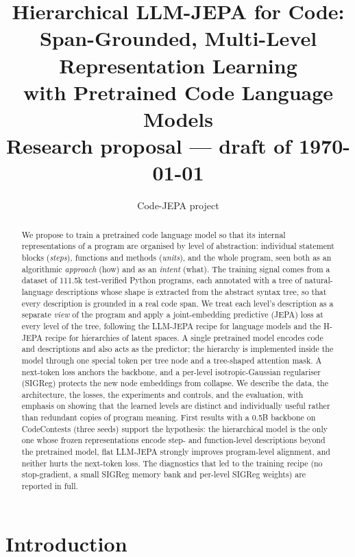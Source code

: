 \documentclass[11pt]{article}
\title{Hierarchical LLM-JEPA for Code:\\
Span-Grounded, Multi-Level Representation Learning\\
with Pretrained Code Language Models\\[0.5em]
\large Research proposal --- draft of \today}
\author{Code-JEPA project}
\date{}
\begin{document}
\maketitle

\begin{abstract}
We propose to train a pretrained code language model so that its internal representations of a program are
organised by level of abstraction: individual statement blocks (\emph{steps}), functions and methods (\emph{units}),
and the whole program, seen both as an algorithmic \emph{approach} (how) and as an \emph{intent} (what). The training
signal comes from a dataset of 111.5k test-verified Python programs, each annotated with a tree of natural-language
descriptions whose shape is extracted from the abstract syntax tree, so that every description is grounded in a
real code span. We treat each level's description as a separate \emph{view} of the program and apply a joint-embedding
predictive (JEPA) loss at every level of the tree, following the LLM-JEPA recipe for language models and the
H-JEPA recipe for hierarchies of latent spaces. A single pretrained model encodes code and descriptions and also
acts as the predictor; the hierarchy is implemented inside the model through one special token per tree node and
a tree-shaped attention mask. A next-token loss anchors the backbone, and a per-level isotropic-Gaussian regulariser
(SIGReg) protects the new node embeddings from collapse. We describe the data, the architecture, the losses, the
experiments and controls, and the evaluation, with emphasis on showing that the learned levels are distinct and
individually useful rather than redundant copies of program meaning. First results with a 0.5B backbone on
CodeContests (three seeds) support the hypothesis: the hierarchical model is the only one whose frozen
representations encode step- and function-level descriptions beyond the pretrained model, flat LLM-JEPA strongly
improves program-level alignment, and neither hurts the next-token loss. The diagnostics that led to the training
recipe (no stop-gradient, a small SIGReg memory bank and per-level SIGReg weights) are reported in full.
\end{abstract}

\section{Introduction}
\end{document}
